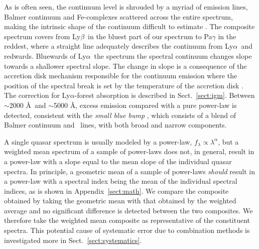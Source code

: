 \documentclass{aa}    %
\newcommand{\figlabel}[1]{\label{fig:#1}}
\newcommand{\sectionname}{Sect.}
\newcommand{\Sect}[1]{\sectionname~\ref{sect:#1}}
\newcommand{\sect}[1]{\Sect{#1}}
\newcommand{\App}[1]{Appendix~\ref{sect:#1}}
\newcommand{\lya}{Ly$\alpha$}
\newcommand{\lyb}{Ly$\beta$}
\newcommand{\feii}{\ion{Fe}{ii}}
\begin{document}


As is often seen, the continuum level is shrouded by a myriad of emission lines,
Balmer continuum and Fe-complexes scattered across the entire spectrum, making
the intrinsic shape of the continuum difficult to estimate \citep{Elvis2001}. 
The composite spectrum covers from \lyb ~in the bluest part of our spectrum to
Pa$\gamma$ in the reddest, where a straight line adequately describes the
continuum from \lya~and redwards. Bluewards of \lya~the spectrum the spectral
continuum changes slope towards a shallower spectral slope. The change in slope
is a consequence of the accretion disk mechanism responsible for the continuum
emission where the position of the spectral break is set by the temperature of the
accretion disk \citep{Pereyra2006}. The correction for \lya-forest absorption is
described in \sect{igm}.
Between $\sim$2000 \AA~and $\sim$5000 \AA, excess emission compared with a
pure power-law is detected, consistent with  the \textit{small blue bump}
\citep{Wills1985}, which consists of a blend of Balmer continuum and \feii
~lines, with both broad and narrow components.

 A single quasar spectrum is usually modeled by a power-law, $f_{\lambda}
\propto \lambda^\alpha$, but a weighted mean spectrum of a sample of power-laws
does not, in general, result in a power-law with a slope equal to the mean slope of
the individual quasar spectra. In principle, a geometric mean of a sample of power-laws
\textit{should} result in a power-law with a spectral index being the mean of the individual spectral indices, as is shown in
\App{math}. We compare the composite obtained by taking the geometric mean with
that obtained by the weighted average and no significant difference is detected
between the two composites. We therefore take the  weighted mean composite as
representative of the constituent spectra. This potential cause of systematic
error due to combination methods is investigated more in \sect{systematics}.
\end{document}
